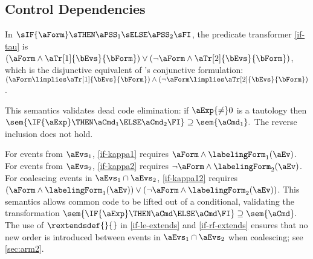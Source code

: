 \subsection{Control Dependencies}
\label{sec:ex:control}

In $\sIF{\aForm}\sTHEN\aPSS_1\sELSE\aPSS_2\sFI$, the predicate transformer
\eqref{if-tau} is
$(\aForm\land\aTr[1]{\bEvs}{\bForm})\lor(\neg\aForm\land\aTr[2]{\bEvs}{\bForm})$,
which is the disjunctive equivalent of \citeauthor{DBLP:journals/cacm/Dijkstra75}'s
conjunctive formulation: $(\aForm\limplies\aTr[1]{\bEvs}{\bForm})\land(\neg\aForm\limplies\aTr[2]{\bEvs}{\bForm})$.

This semantics validates dead code elimination:
if $\aExp{\neq}0$ is a tautology then
\begin{math}
  \sem{\IF{\aExp}\THEN\aCmd_1\ELSE\aCmd_2\FI} \supseteq
  \sem{\aCmd_1}.
\end{math}
The reverse inclusion does not hold.

For events from $\aEvs_1$, \ref{if-kappa1} requires
$\aForm\land\labelingForm_1(\aEv)$. For events from $\aEvs_2$,
\ref{if-kappa2} requires $\lnot\aForm\land\labelingForm_2(\aEv)$.  For
coalescing events in $\aEvs_1\cap\aEvs_2$, \ref{if-kappa12} requires
$(\aForm\land\labelingForm_1(\aEv)) \lor
(\lnot\aForm\land\labelingForm_2(\aEv))$.  This semantics allows common code
to be lifted out of a conditional, validating the transformation
\begin{math}
  \sem{\IF{\aExp}\THEN\aCmd\ELSE\aCmd\FI} \supseteq
  \sem{\aCmd}.
\end{math}
%
The use of $\rextendsdef{}{}$ in \ref{if-le-extends} and \ref{if-rf-extends}
ensures that no new order is introduced between events in
$\aEvs_1\cap\aEvs_2$ when coalescing; see \textsection\ref{sec:arm2}.



